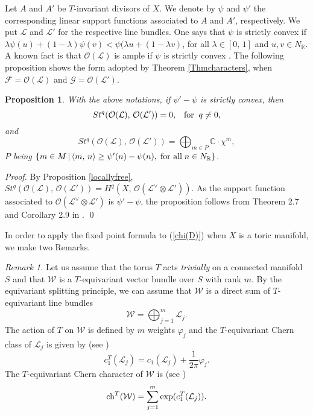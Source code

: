 \documentclass[xypic,amscd,syntonly,amssymb,verbatim,12pt]{amsart}
\theoremstyle{plain}
\newtheorem{Prop}[Thm]{Proposition}
\theoremstyle{definition}
\theoremstyle{remark}
\numberwithin{equation}{section}
\begin{document}
Let $A$ and $A'$ be $T$-invariant divisors of $X$. We denote by
$\psi$ and $\psi'$ the corresponding linear support functions
associated to $A$ and $A'$, respectively. We put ${\mathcal L}$
and ${\mathcal L}'$ for the respective line bundles. One says that
$\psi$ is strictly convex if
$\lambda\psi(u)+(1-\lambda)\psi(v)<\psi(\lambda u+(1-\lambda v)$,
for all $\lambda\in [0,\,1]$ and $u,v\in N_{\mathbb R}$. A known
fact is that ${\mathcal O}({\mathcal L})$ is ample if $\psi$ is
strictly convex \cite[page 70]{Fulton}. The following proposition
shows the form adopted by Theorem \ref{Thmcharacters}, when
${\mathcal F}={\mathcal O}({\mathcal L})$ and ${\mathcal
G}={\mathcal O}({\mathcal L'})$.
 \begin{Prop}\label{PropConvex}
 With the above notations, if $\psi'-\psi$ is strictly convex, then
 $$St^q({\mathcal O}({\mathcal L}),\,{\mathcal O}({\mathcal
 L}'))=0,\;\;\; \hbox{for}\;\;q\ne 0,$$
 and
  $$St^q({\mathcal O}({\mathcal L}),\,{\mathcal O}({\mathcal
 L}'))=\bigoplus_{m\in P} {\mathbb C}\cdot\chi^m,$$
 $P$ being $\{m\in M\,|\,\langle m,\, n\rangle\geq
 \psi'(n)-\psi(n),\;\hbox{for all}\; n\in N_{\mathbb R}\}$.
\end{Prop}
 {\it Proof.} By Proposition \ref{locallyfree},
 $St^q({\mathcal O}({\mathcal L}),\,{\mathcal O}({\mathcal
 L}'))=H^q(X,\,{\mathcal O}({\mathcal L}^{\vee}\otimes{\mathcal
 L'})).$ As the support function associated to ${\mathcal O}({\mathcal L}^{\vee}\otimes{\mathcal
 L'})$ is $\psi'-\psi$, the proposition follows from Theorem 2.7 and Corollary
 2.9 in \cite{Oda}.
  \qed



\smallskip

In order to apply the fixed point formula to (\ref{chi(D)}) when $X$ is a toric manifold, we make two Remarks.

{\it Remark 1.}
Let us assume that the torus $T$ acts {\em trivially} on a connected manifold   $S$ and that ${\mathcal W}$ is a $T$-equivariant vector bundle over $S$ with rank $m$.
By the equivariant splitting principle,
we can assume that ${\mathcal W}$ is a direct sum of $T$-equivariant line bundles
 $${\mathcal W}=\bigoplus_{j=1}^m{\mathcal L}_j.$$
 The action of $T$ on ${\mathcal W}$ is defined by $m$ weights $\varphi_j$ and the $T$-equivariant
 Chern class of ${\mathcal L}_j$ is given by (see \cite[page 317]{G-G-K})
  \begin{equation}\label{cT1}
  c^T_1({\mathcal L_j})=c_1({\mathcal L}_j)+\frac{1}{2\pi}\varphi_j.
   \end{equation}
 The $T$-equivariant Chern character of ${\mathcal W}$ is (see \cite[page
  234]{L-M})
 \begin{equation}\label{chT}
 {\rm ch}^T({\mathcal W})=\sum_{j=1}^m{\rm exp}(c_1^T({\mathcal L}_j)).
  \end{equation}
\end{document}
